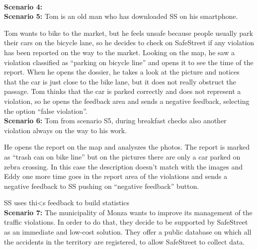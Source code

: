 \documentclass[../RASD.tex]{subfiles}
\begin{document}
            \\
            \textbf{Scenario 4:}
            \\
            \textbf{Scenario 5:} Tom is an old man who has downloaded SS on his smartphone.

            Tom wants to bike to the market, but he feels unsafe because people usually park their cars on the bicycle lane, so he decides to check on SafeStreet if any violation has been reported on the way to the market.  Looking on the map, he saw a violation classified as “parking on bicycle line” and opens it to see the time of the report. When he opens the dossier, he takes a look at the picture and notices that the car is just close to the bike lane, but it does not really obstruct the passage. Tom thinks that the car is parked correctly and does not represent a violation, so he opens the feedback area and sends a negative feedback, selecting the option “false violation”.
            \\
            \textbf{Scenario 6:} Tom from scenario S5, during breakfast checks also another violation always on the way to his work.

             He opens the report on the map and analyszes the photos. The report is marked as “trash can on bike line” but on the pictures there are only a car parked on zebra crossing. In this case the description doesn’t match with the images and Eddy one more time goes in the report area of the violations and sends a negative feedback to SS pushing on “negative feedback” button.

            SS uses thi<s feedback to build statistics
            \\
            \textbf{Scenario 7:} The municipality of Monza wants to improve its management of the traffic violations. In order to do that, they decide to be supported by SafeStreet as an immediate and low-cost solution. They offer a public database on which all the accidents in the territory are registered, to allow SafeStreet to collect data.
\end{document}
